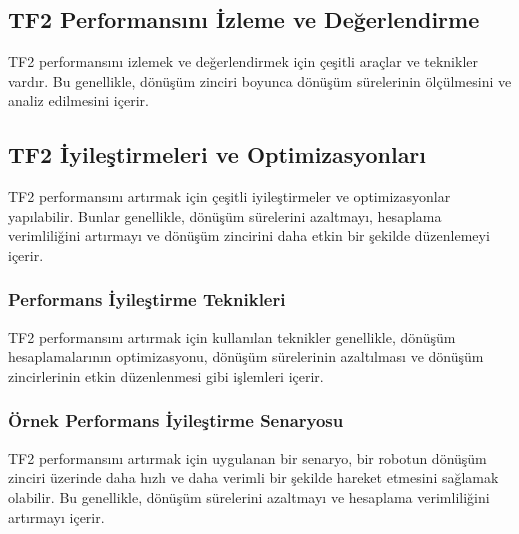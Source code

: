 \subsection{TF2 Performansını İzleme ve Değerlendirme}
TF2 performansını izlemek ve değerlendirmek için çeşitli araçlar ve teknikler vardır. Bu genellikle, dönüşüm zinciri boyunca dönüşüm sürelerinin ölçülmesini ve analiz edilmesini içerir.

\subsection{TF2 İyileştirmeleri ve Optimizasyonları}
TF2 performansını artırmak için çeşitli iyileştirmeler ve optimizasyonlar yapılabilir. Bunlar genellikle, dönüşüm sürelerini azaltmayı, hesaplama verimliliğini artırmayı ve dönüşüm zincirini daha etkin bir şekilde düzenlemeyi içerir.

\subsubsection{Performans İyileştirme Teknikleri}
TF2 performansını artırmak için kullanılan teknikler genellikle, dönüşüm hesaplamalarının optimizasyonu, dönüşüm sürelerinin azaltılması ve dönüşüm zincirlerinin etkin düzenlenmesi gibi işlemleri içerir.

\subsubsection{Örnek Performans İyileştirme Senaryosu}
TF2 performansını artırmak için uygulanan bir senaryo, bir robotun dönüşüm zinciri üzerinde daha hızlı ve daha verimli bir şekilde hareket etmesini sağlamak olabilir. Bu genellikle, dönüşüm sürelerini azaltmayı ve hesaplama verimliliğini artırmayı içerir.